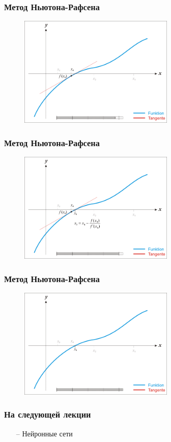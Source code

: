 \documentclass[10pt]{beamer}
\begin{document}
\begin{frame}\frametitle{Метод Ньютона-Рафсена}
\begin{figure}[htbp]
  \includegraphics[height=150pt, keepaspectratio = true]{images/newton-15}   
\end{figure}
\end{frame}
\begin{frame}\frametitle{Метод Ньютона-Рафсена}
\begin{figure}[htbp]
  \includegraphics[height=150pt, keepaspectratio = true]{images/newton-16}   
\end{figure}
\end{frame}
\begin{frame}\frametitle{Метод Ньютона-Рафсена}
\begin{figure}[htbp]
  \includegraphics[height=150pt, keepaspectratio = true]{images/newton-17}   
\end{figure}
\end{frame}




\begin{frame}\frametitle{На следующей лекции}
\begin{itemize}
\item[--] Нейронные сети
\end{itemize}
\end{frame}
\end{document}
